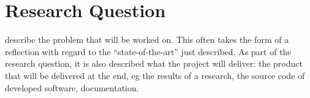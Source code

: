 \section{Research Question}
describe the problem that will be worked on. This often takes the form of
a reflection with regard to the “state-of-the-art” just described. As part of the research question, it
is also described what the project will deliver: the product that will be delivered at the end, eg the
results of a research, the source code of developed software, documentation.